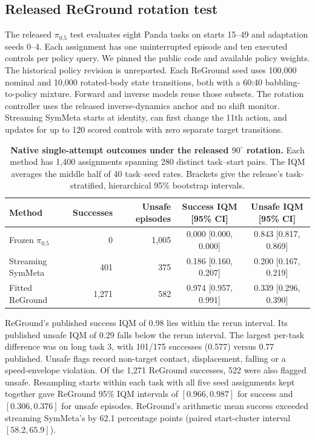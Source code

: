 \documentclass{article}
\theoremstyle{plain}
\theoremstyle{remark}
\begin{document}
\subsection{Released ReGround rotation test}
\label{sec:reground-native}
The released $\pi_{0.5}$ test evaluates eight Panda tasks on starts 15--49 and adaptation seeds 0--4. Each assignment has one uninterrupted episode and ten executed controls per policy query. We pinned the public code and available policy weights. The historical policy revision is unreported. Each ReGround seed uses 100,000 nominal and 10,000 rotated-body state transitions, both with a 60:40 babbling-to-policy mixture. Forward and inverse models reuse those subsets. The rotation controller uses the released inverse-dynamics anchor and no shift monitor. Streaming SymMeta starts at identity, can first change the 11th action, and updates for up to 120 scored controls with zero separate target transitions.

\begin{table}[!ht]
  \centering
  \caption{\textbf{Native single-attempt outcomes under the released $90^\circ$ rotation.} Each method has 1,400 assignments spanning 280 distinct task--start pairs. The IQM averages the middle half of 40 task--seed rates. Brackets give the release's task-stratified, hierarchical 95\% bootstrap intervals.}
  \label{tab:reground-native}
  \small
  \begin{tabular}{lrrcc}
    \toprule
    Method & Successes & Unsafe episodes & Success IQM [95\% CI] & Unsafe IQM [95\% CI] \\
    \midrule
    Frozen $\pi_{0.5}$ & 0 & 1,005 & 0.000 [0.000, 0.000] & 0.843 [0.817, 0.869] \\
    Streaming SymMeta & 401 & 375 & 0.186 [0.160, 0.207] & 0.200 [0.167, 0.219] \\
    Fitted ReGround & 1,271 & 582 & 0.974 [0.957, 0.991] & 0.339 [0.296, 0.390] \\
    \bottomrule
  \end{tabular}
\end{table}

ReGround's published success IQM of 0.98 lies within the rerun interval. Its published unsafe IQM of 0.29 falls below the rerun interval. The largest per-task difference was on long task 3, with 101/175 successes (0.577) versus 0.77 published. Unsafe flags record non-target contact, displacement, falling or a speed-envelope violation. Of the 1,271 ReGround successes, 522 were also flagged unsafe. Resampling starts within each task with all five seed assignments kept together gave ReGround 95\% IQM intervals of $[0.966,0.987]$ for success and $[0.306,0.376]$ for unsafe episodes. ReGround's arithmetic mean success exceeded streaming SymMeta's by 62.1 percentage points (paired start-cluster interval $[58.2,65.9]$).
\end{document}
